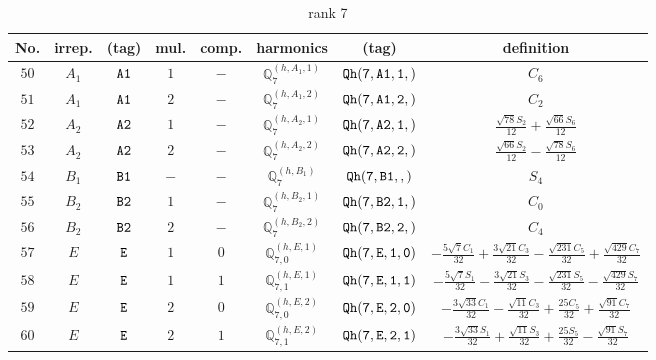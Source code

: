 \documentclass[fleqn,8pt]{jsarticle}
\begin{document}
\begin{table}[ht!]
\begin{center}
\caption{rank 7}
\renewcommand{\arraystretch}{1.3}
\begin{tabular}{cccccccc} \hline \hline
No. & irrep. & (tag) & mul. & comp. & harmonics & (tag) & definition \\ \hline
$ 50 $ & $ A_{1} $ & $ {\tt A1} $ & $ 1 $ & $ - $ & $ \mathbb{Q}_{7}^{(h,A_{1},1)} $ & $ {\tt Qh(7,A1,1,)} $ & $ C_{6} $ \\
$ 51 $ & $ A_{1} $ & $ {\tt A1} $ & $ 2 $ & $ - $ & $ \mathbb{Q}_{7}^{(h,A_{1},2)} $ & $ {\tt Qh(7,A1,2,)} $ & $ C_{2} $ \\
$ 52 $ & $ A_{2} $ & $ {\tt A2} $ & $ 1 $ & $ - $ & $ \mathbb{Q}_{7}^{(h,A_{2},1)} $ & $ {\tt Qh(7,A2,1,)} $ & $ \frac{\sqrt{78} S_{2}}{12} + \frac{\sqrt{66} S_{6}}{12} $ \\
$ 53 $ & $ A_{2} $ & $ {\tt A2} $ & $ 2 $ & $ - $ & $ \mathbb{Q}_{7}^{(h,A_{2},2)} $ & $ {\tt Qh(7,A2,2,)} $ & $ \frac{\sqrt{66} S_{2}}{12} - \frac{\sqrt{78} S_{6}}{12} $ \\
$ 54 $ & $ B_{1} $ & $ {\tt B1} $ & $ - $ & $ - $ & $ \mathbb{Q}_{7}^{(h,B_{1})} $ & $ {\tt Qh(7,B1,,)} $ & $ S_{4} $ \\
$ 55 $ & $ B_{2} $ & $ {\tt B2} $ & $ 1 $ & $ - $ & $ \mathbb{Q}_{7}^{(h,B_{2},1)} $ & $ {\tt Qh(7,B2,1,)} $ & $ C_{0} $ \\
$ 56 $ & $ B_{2} $ & $ {\tt B2} $ & $ 2 $ & $ - $ & $ \mathbb{Q}_{7}^{(h,B_{2},2)} $ & $ {\tt Qh(7,B2,2,)} $ & $ C_{4} $ \\
$ 57 $ & $ E $ & $ {\tt E} $ & $ 1 $ & $ 0 $ & $ \mathbb{Q}_{7,0}^{(h,E,1)} $ & $ {\tt Qh(7,E,1,0)} $ & $ - \frac{5 \sqrt{7} C_{1}}{32} + \frac{3 \sqrt{21} C_{3}}{32} - \frac{\sqrt{231} C_{5}}{32} + \frac{\sqrt{429} C_{7}}{32} $ \\
$ 58 $ & $ E $ & $ {\tt E} $ & $ 1 $ & $ 1 $ & $ \mathbb{Q}_{7,1}^{(h,E,1)} $ & $ {\tt Qh(7,E,1,1)} $ & $ - \frac{5 \sqrt{7} S_{1}}{32} - \frac{3 \sqrt{21} S_{3}}{32} - \frac{\sqrt{231} S_{5}}{32} - \frac{\sqrt{429} S_{7}}{32} $ \\
$ 59 $ & $ E $ & $ {\tt E} $ & $ 2 $ & $ 0 $ & $ \mathbb{Q}_{7,0}^{(h,E,2)} $ & $ {\tt Qh(7,E,2,0)} $ & $ - \frac{3 \sqrt{33} C_{1}}{32} - \frac{\sqrt{11} C_{3}}{32} + \frac{25 C_{5}}{32} + \frac{\sqrt{91} C_{7}}{32} $ \\
$ 60 $ & $ E $ & $ {\tt E} $ & $ 2 $ & $ 1 $ & $ \mathbb{Q}_{7,1}^{(h,E,2)} $ & $ {\tt Qh(7,E,2,1)} $ & $ - \frac{3 \sqrt{33} S_{1}}{32} + \frac{\sqrt{11} S_{3}}{32} + \frac{25 S_{5}}{32} - \frac{\sqrt{91} S_{7}}{32} $ \\

\end{tabular}
\end{center}
\end{table}
\end{document}

